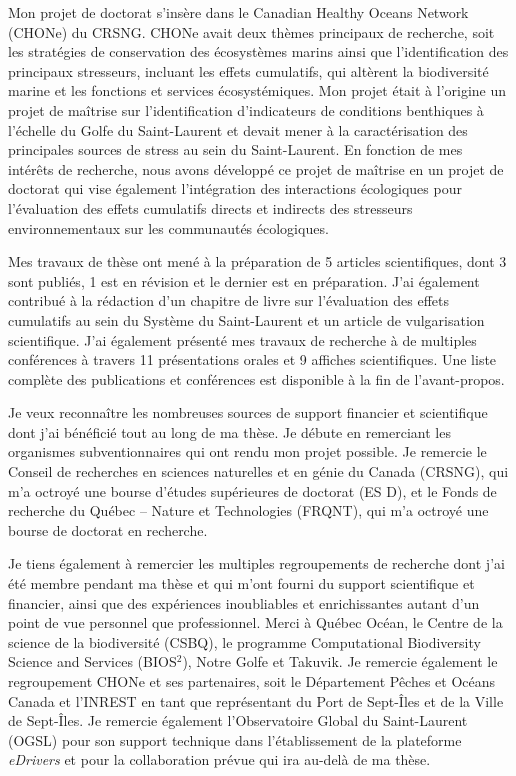 Mon projet de doctorat s'insère dans le Canadian Healthy Oceans Network
(CHONe) du CRSNG. CHONe avait deux thèmes principaux de recherche, soit
les stratégies de conservation des écosystèmes marins ainsi que
l'identification des principaux stresseurs, incluant les effets
cumulatifs, qui altèrent la biodiversité marine et les fonctions et
services écosystémiques. Mon projet était à l'origine un projet de
maîtrise sur l'identification d'indicateurs de conditions benthiques à
l'échelle du Golfe du Saint-Laurent et devait mener à la caractérisation
des principales sources de stress au sein du Saint-Laurent. En fonction
de mes intérêts de recherche, nous avons développé ce projet de maîtrise
en un projet de doctorat qui vise également l'intégration des
interactions écologiques pour l'évaluation des effets cumulatifs directs
et indirects des stresseurs environnementaux sur les communautés
écologiques.

Mes travaux de thèse ont mené à la préparation de 5 articles
scientifiques, dont 3 sont publiés, 1 est en révision et le dernier est
en préparation. J'ai également contribué à la rédaction d'un chapitre de
livre sur l'évaluation des effets cumulatifs au sein du Système du
Saint-Laurent et un article de vulgarisation scientifique. J'ai
également présenté mes travaux de recherche à de multiples conférences à
travers 11 présentations orales et 9 affiches scientifiques. Une liste
complète des publications et conférences est disponible à la fin de
l'avant-propos.

Je veux reconnaître les nombreuses sources de support financier et
scientifique dont j'ai bénéficié tout au long de ma thèse. Je débute en
remerciant les organismes subventionnaires qui ont rendu mon projet
possible. Je remercie le Conseil de recherches en sciences naturelles et
en génie du Canada (CRSNG), qui m'a octroyé une bourse d'études
supérieures de doctorat (ES D), et le Fonds de recherche du Québec --
Nature et Technologies (FRQNT), qui m'a octroyé une bourse de doctorat
en recherche.

Je tiens également à remercier les multiples regroupements de recherche
dont j'ai été membre pendant ma thèse et qui m'ont fourni du support
scientifique et financier, ainsi que des expériences inoubliables et
enrichissantes autant d'un point de vue personnel que professionnel.
Merci à Québec Océan, le Centre de la science de la biodiversité (CSBQ),
le programme Computational Biodiversity Science and Services
(BIOS\(^2\)), Notre Golfe et Takuvik. Je remercie également le
regroupement CHONe et ses partenaires, soit le Département Pêches et
Océans Canada et l'INREST en tant que représentant du Port de Sept-Îles
et de la Ville de Sept-Îles. Je remercie également l'Observatoire Global
du Saint-Laurent (OGSL) pour son support technique dans l'établissement
de la plateforme \emph{eDrivers} et pour la collaboration prévue qui ira
au-delà de ma thèse.

